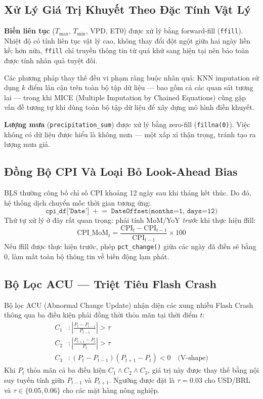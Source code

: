 \documentclass[conference]{IEEEtran}
\begin{document}
\subsection{Xử Lý Giá Trị Khuyết Theo Đặc Tính Vật Lý}

\textbf{Biến liên tục} ($T_{\max}$, $T_{\min}$, VPD, ET0) được xử lý bằng
forward-fill (\texttt{ffill}). Nhiệt độ có tính liên tục vật lý cao, không
thay đổi đột ngột giữa hai ngày liền kề; hơn nữa, \texttt{ffill} chỉ truyền
thông tin từ quá khứ sang hiện tại nên bảo toàn được tính nhân quả tuyệt đối.

Các phương pháp thay thế đều vi phạm ràng buộc nhân quả: KNN imputation sử
dụng $k$ điểm lân cận trên toàn bộ tập dữ liệu --- bao gồm cả các quan sát
tương lai --- trong khi MICE (Multiple Imputation by Chained Equations) cũng
gặp vấn đề tương tự khi dùng toàn bộ tập dữ liệu để xây dựng mô hình điền
khuyết.

\textbf{Lượng mưa} (\texttt{precipitation\_sum}) được xử lý bằng zero-fill
(\texttt{fillna(0)}). Việc không có dữ liệu được hiểu là không mưa --- một
xấp xỉ thận trọng, tránh tạo ra lượng mưa giả.

\subsection{Đồng Bộ CPI Và Loại Bỏ Look-Ahead Bias}

BLS thường công bố chỉ số CPI khoảng 12 ngày sau khi tháng kết thúc. Do đó,
hệ thống dịch chuyển mốc thời gian tương ứng:
\begin{equation}
\texttt{cpi\_df['Date']} \;\mathrel{+}=\;
\texttt{DateOffset(months=1, days=12)}
\label{eq:cpi_shift}
\end{equation}
Thứ tự xử lý ở đây rất quan trọng: phải tính MoM/YoY \emph{trước} khi thực
hiện ffill:
\begin{equation}
\text{CPI\_MoM}_t = \frac{\text{CPI}_t - \text{CPI}_{t-1}}{\text{CPI}_{t-1}}
\times 100
\label{eq:cpi_mom}
\end{equation}
Nếu ffill được thực hiện trước, phép \texttt{pct\_change()} giữa các ngày đã
điền sẽ bằng 0, làm mất toàn bộ thông tin về biến động lạm phát.

\subsection{Bộ Lọc ACU --- Triệt Tiêu Flash Crash}

Bộ lọc ACU (Abnormal Change Update) nhận diện các xung nhiễu Flash Crash
thông qua ba điều kiện phải đồng thời thỏa mãn tại thời điểm $t$:
\begin{align}
C_1 &: \left|\frac{P_t - P_{t-1}}{P_{t-1}}\right| > \tau
  \label{eq:acu1} \\
C_2 &: \left|\frac{P_{t+1} - P_t}{P_t}\right| > \tau
  \label{eq:acu2} \\
C_3 &: (P_t - P_{t-1})(P_{t+1} - P_t) < 0 \quad \text{(V-shape)}
  \label{eq:acu3}
\end{align}
Khi $P_t$ thỏa mãn cả ba điều kiện $C_1 \wedge C_2 \wedge C_3$, giá trị này
được thay thế bằng nội suy tuyến tính giữa $P_{t-1}$ và $P_{t+1}$. Ngưỡng
được đặt là $\tau = 0.03$ cho USD/BRL và $\tau \in \{0.05, 0.06\}$ cho các
mặt hàng nông nghiệp.
\end{document}

